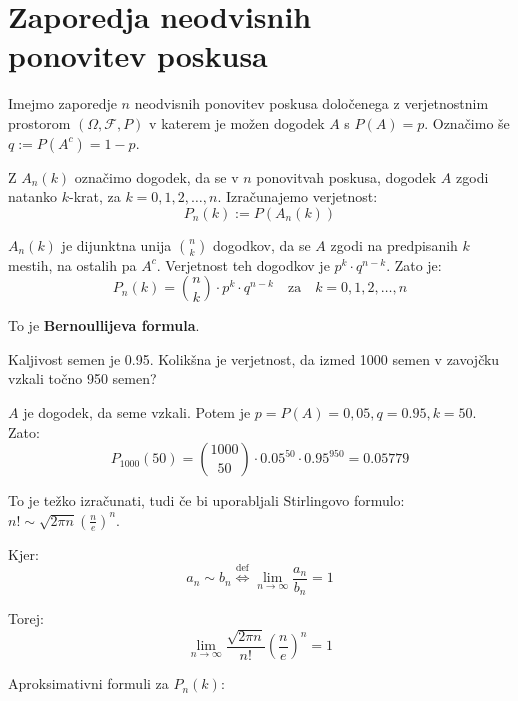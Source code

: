 \documentclass[12pt]{book}
\def\n{\noindent}
\theoremstyle{definition}
\theoremstyle{plain}
\theoremstyle{plain}
\theoremstyle{plain}
\theoremstyle{remark}
\begin{document}
\chapter[Zaporedja neodvisnih ponovitev poskusa]{Zaporedja neodvisnih\\ponovitev poskusa}

\n Imejmo zaporedje $n$ neodvisnih ponovitev poskusa določenega z verjetnostnim prostorom $(\Omega, \mathcal{F}, P)$ v katerem je možen dogodek $A$ s $P(A) = p$. Označimo še $q := P(A^c) = 1-p$. 

Z $A_n(k)$ označimo dogodek, da se v $n$ ponovitvah poskusa, dogodek $A$ zgodi natanko $k$-krat, za $k=0, 1, 2, \ldots , n$. Izračunajemo verjetnost:
$$
P_n(k):=P\left(A_n(k)\right)
$$

$A_n(k)$ je dijunktna unija $\binom{n}{k}$ dogodkov, da se $A$ zgodi na predpisanih $k$ mestih, na ostalih pa $A^c$. Verjetnost teh dogodkov je $p^k \cdot q^{n-k}$. Zato je: 
$$
P_n(k) = \binom{n}{k} \cdot p^k \cdot q^{n-k} \quad \text{za} \quad k=0, 1, 2, \ldots , n
$$

To je \textbf{Bernoullijeva formula}.

\begin{zgled}
    Kaljivost semen je 0.95. Kolikšna je verjetnost, da izmed 1000 semen v zavojčku vzkali točno 950 semen?

    $A$ je dogodek, da seme vzkali. Potem je $p=P(A)=0,05, q=0.95, k=50$. Zato: 
    $$
    P_{1000}(50) = \binom{1000}{50}\cdot 0.05^{50} \cdot 0.95^{950} = 0.05779
    $$
\end{zgled}

\newpage

\n To je težko izračunati, tudi če bi uporabljali Stirlingovo formulo: $n! \sim \sqrt{2 \pi n} \left(\frac{n}{e}\right)^n$.

Kjer: 
$$
a_n \sim b_n \overset{\text{def}}{\iff} \lim_{n \to \infty} \frac{a_n}{b_n} = 1
$$

Torej:
$$
\lim _{n \to \infty} \frac{\sqrt{2 \pi n}}{n !}\left(\frac{n}{e}\right)^n=1
$$

\n Aproksimativni formuli za $P_n(k)$:
\end{document}
